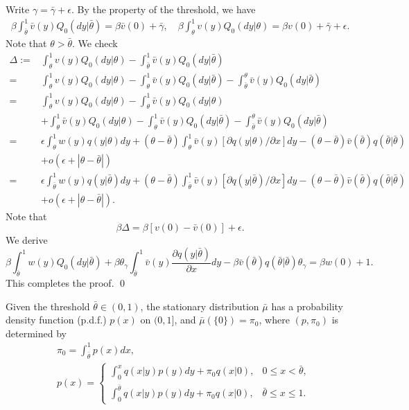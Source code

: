\documentclass[graybox]{svmult}
\begin{document}
\proof
Write $\gamma=\bar \gamma +\epsilon$. By the property of the threshold,   we have
\begin{align*}
\beta\int_{\bar \theta}^1 \bar v(y) Q_0(dy|\bar \theta)  =  \beta \bar v(0)+\bar \gamma,\quad
\beta \int_{\theta}^1 v(y) Q_0(dy|\theta)= \beta v(0)+\bar \gamma+\epsilon. \end{align*}
Note that $\theta>\bar \theta$. We check
\begin{align*}
\Delta:=&\int_{\theta}^1 v(y) Q_0(dy|\theta)-
\int_{\bar \theta}^1 \bar v(y) Q_0(dy|\bar \theta)\\
=& \int_{\theta}^1 v(y) Q_0(dy|\theta)-
\int_{\theta}^1 \bar v(y) Q_0(dy|\bar \theta)-
\int_{\bar \theta}^\theta \bar v(y) Q_0(dy|\bar \theta)\\
=&  \int_{\theta}^1 v(y) Q_0(dy|\theta)-
\int_{\theta}^1 \bar v(y) Q_0(dy| \theta)\\
& +  \int_{\theta}^1 \bar v(y) Q_0(dy| \theta)-
\int_{\theta}^1 \bar v(y) Q_0(dy|\bar \theta)-
\int_{\bar \theta}^\theta \bar v(y) Q_0(dy|\bar \theta)\\
=&\epsilon \int_\theta^1 w(y)q(y|\theta)dy +(\theta-\bar\theta) \int_\theta^1 \bar v(y) [\partial q(y|\theta) / \partial x]dy-(\theta-\bar \theta)\bar v(\bar\theta)q(\bar\theta|\bar\theta)\\
 &+o(\epsilon+|\theta-\bar \theta|)  \\
=&\epsilon \int_{\bar \theta}^1 w(y)q(y|\bar\theta)dy +(\theta-\bar\theta) \int_{\bar\theta}^1 \bar v(y) [\partial q(y|\bar\theta) / \partial x]dy-(\theta-\bar \theta)\bar v(\bar\theta)q(\bar\theta|\bar\theta)\\
&+o(\epsilon+|\theta-\bar \theta|).
\end{align*}
Note that
$$
\beta \Delta= \beta [v(0)-\bar v(0)] +\epsilon.
$$
We derive
$$
\beta \int_{\bar\theta}^1 w(y) Q_0(dy|\bar\theta)
+ \beta {\theta_\gamma} \int_{\bar\theta}^1 \bar v(y) \frac{\partial q(y|\bar \theta)}{\partial x} dy-\beta \bar v(\bar\theta) q(\bar\theta| \bar\theta) {\theta_\gamma} =\beta w(0)+1.
$$
This completes the proof.
\qed


\begin{lemma}
Given the threshold $\bar \theta\in (0, 1)$,
 the stationary distribution  $\bar \mu$ has a probability density function (p.d.f.) $p(x)$ on $(0, 1]$, and $\bar \mu(\{0\})= \pi_0$, where $(p, \pi_0)$ is determined by
\begin{align}
&\pi_0=\int_{\bar\theta}^1 p(x) dx, \label{mup0} \\
&{\displaystyle{ p(x)=
\begin{cases}
 \displaystyle
 \int_0^x q(x|y) p(y) dy +\pi_0q(x|0), &0\le  x<\bar \theta,\\
 \displaystyle
\int_0^{\bar \theta} q(x|y) p(y) dy+\pi_0 q(x|0), &  \bar \theta \le x\le 1.
\end{cases}}}\label{pinv}
\end{align}
\end{lemma}
\end{document}
